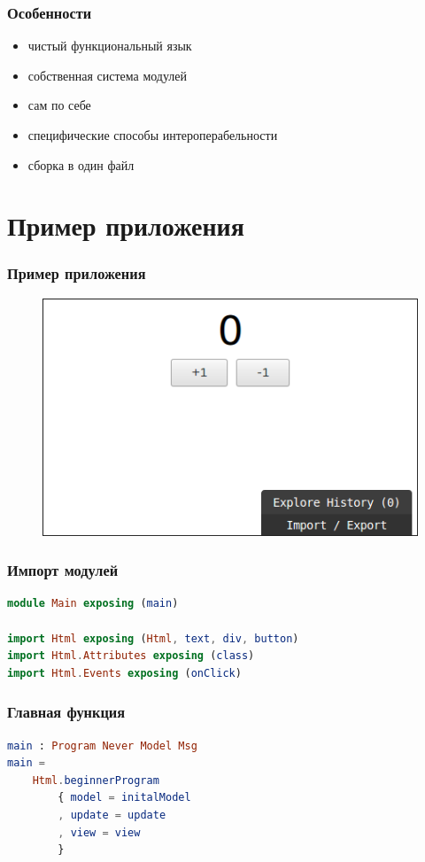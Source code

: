 \documentclass[11pt,aspectratio=169]{beamer}
\begin{document}
\begin{frame}
\frametitle{Особенности}
\begin{itemize}
	\item чистый функциональный язык
	\item собственная система модулей
	\item сам по себе
	\item специфические способы интероперабельности
	\item сборка в один файл
\end{itemize}
\end{frame}

\section{Пример приложения}

\begin{frame}
\frametitle{Пример приложения}
\begin{figure}
	\includegraphics[scale=0.5]{elm-app-sample}
\end{figure}
\end{frame}

\begin{frame}[fragile]
\frametitle{Импорт модулей}
\begin{lstlisting}[language=elm]
module Main exposing (main)

import Html exposing (Html, text, div, button)
import Html.Attributes exposing (class)
import Html.Events exposing (onClick)
\end{lstlisting}
\end{frame}

\begin{frame}[fragile]
\frametitle{Главная функция}
\begin{lstlisting}[language=elm]
main : Program Never Model Msg
main =
    Html.beginnerProgram
        { model = initalModel
        , update = update
        , view = view
        }
\end{lstlisting}
\end{frame}
\end{document}
